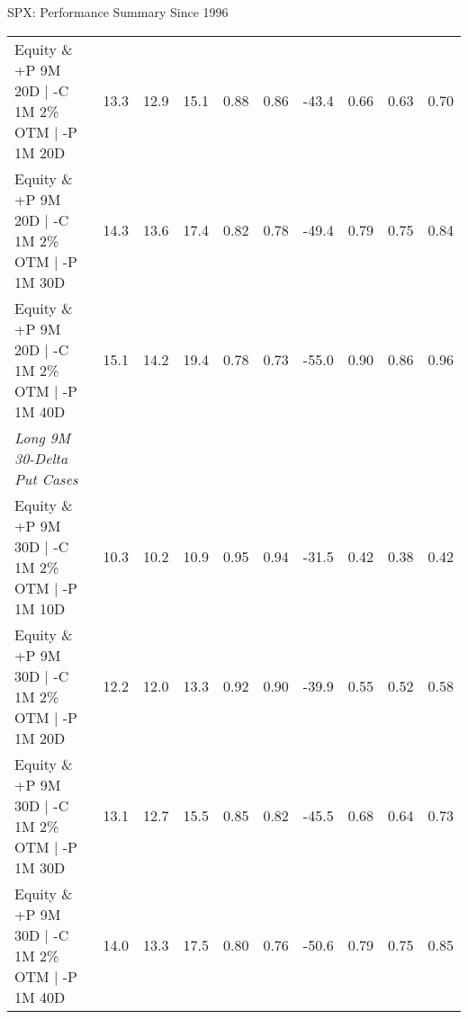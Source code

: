 \documentclass{beamer}
\begin{document}
\begin{frame}{SPX: Performance Summary Since 1996}
{\begin{tabular}{lrrrrrrrrr}
Equity \& +P 9M 20D $|$ -C 1M 2\% OTM $|$ -P 1M 20D & 13.3 & 12.9 & 15.1 & 0.88 & 0.86 & -43.4 & 0.66 & 0.63 & 0.70\\
Equity \& +P 9M 20D $|$ -C 1M 2\% OTM $|$ -P 1M 30D & 14.3 & 13.6 & 17.4 & 0.82 & 0.78 & -49.4 & 0.79 & 0.75 & 0.84\\
Equity \& +P 9M 20D $|$ -C 1M 2\% OTM $|$ -P 1M 40D & 15.1 & 14.2 & 19.4 & 0.78 & 0.73 & -55.0 & 0.90 & 0.86 & 0.96\\
\midrule
\addlinespace
{\em Long 9M 30-Delta Put Cases} \\
\addlinespace
Equity \& +P 9M 30D $|$ -C 1M 2\% OTM $|$ -P 1M 10D & 10.3 & 10.2 & 10.9 & 0.95 & 0.94 & -31.5 & 0.42 & 0.38 & 0.42\\
Equity \& +P 9M 30D $|$ -C 1M 2\% OTM $|$ -P 1M 20D & 12.2 & 12.0 & 13.3 & 0.92 & 0.90 & -39.9 & 0.55 & 0.52 & 0.58\\
Equity \& +P 9M 30D $|$ -C 1M 2\% OTM $|$ -P 1M 30D & 13.1 & 12.7 & 15.5 & 0.85 & 0.82 & -45.5 & 0.68 & 0.64 & 0.73\\
Equity \& +P 9M 30D $|$ -C 1M 2\% OTM $|$ -P 1M 40D & 14.0 & 13.3 & 17.5 & 0.80 & 0.76 & -50.6 & 0.79 & 0.75 & 0.85\\
\midrule
\bottomrule
\end{tabular}
}
\end{frame}
\end{document}
